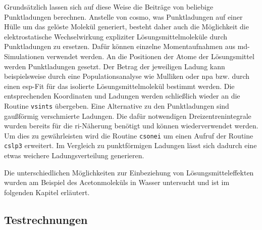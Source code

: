 Grundsätzlich lassen sich auf diese Weise die Beiträge von beliebige Punktladungen berechnen. Anstelle von \ac{cosmo}, was Punktladungen auf einer Hülle um das gelöste Molekül generiert, besteht daher auch die Möglichkeit die elektrostatische Wechselwirkung expliziter Lösungsmittelmoleküle durch Punktladungen zu ersetzen. Dafür können einzelne Momentaufnahmen aus \ac{md}-Simulationen verwendet werden. An die Positionen der Atome der Lösungsmittel werden Punktladungen gesetzt. Der Betrag der jeweiligen Ladung kann beispielsweise durch eine Populationsanalyse wie Mulliken\supercite{mulliken1955electronic} oder \ac{npa}\supercite{reed1985natural} bzw. durch einen \ac{esp}-Fit\supercite{singh1984approach} für das isolierte Lösungsmittelmolekül bestimmt werden. Die entsprechenden Koordinaten und Ladungen werden schließlich wieder an die Routine \texttt{vsints} übergeben. Eine Alternative zu den Punktladungen sind gaußförmig verschmierte Ladungen. Die dafür notwendigen Dreizentrenintegrale wurden bereits für die \ac{ri}-Näherung benötigt und können wiederverwendet werden. Um dies zu gewährleisten wird die Routine \texttt{csonei} um einen Aufruf der Routine \texttt{cslp3} erweitert. Im Vergleich zu punktförmigen Ladungen lässt sich dadurch eine etwas weichere Ladungsverteilung generieren. 

Die unterschiedlichen Möglichkeiten zur Einbeziehung von Lösungsmitteleffekten wurden am Beispiel des Acetonmoleküls in Wasser untersucht und ist im folgenden Kapitel erläutert.
	\subsection{Testrechnungen}\label{lömitest}
	
